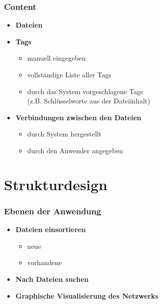 \begin{frame}

\frametitle{Content}
\label{content}

\begin{itemize}
\item \textbf{Dateien}

\item \textbf{Tags}

\begin{itemize}
\item manuell eingegeben

\item vollständige Liste aller Tags

\item durch das System vorgeschlagene Tags\\
(z.B. Schlüsselworte aus der Dateiinhalt)

\end{itemize}

\item \textbf{Verbindungen zwischen den Dateien}

\begin{itemize}
\item durch System hergestellt

\item durch den Anwender angegeben

\end{itemize}

\end{itemize}

\end{frame}

\section{Strukturdesign}
\label{strukturdesign}

\begin{frame}

\frametitle{Ebenen der Anwendung}
\label{ebenenderanwendung}

\begin{itemize}
\item \textbf{Dateien einsortieren}

\begin{itemize}
\item neue

\item vorhandene

\end{itemize}

\item \textbf{Nach Dateien suchen}

\item \textbf{Graphische Visualisierung des Netzwerks}

\end{itemize}

\end{frame}

